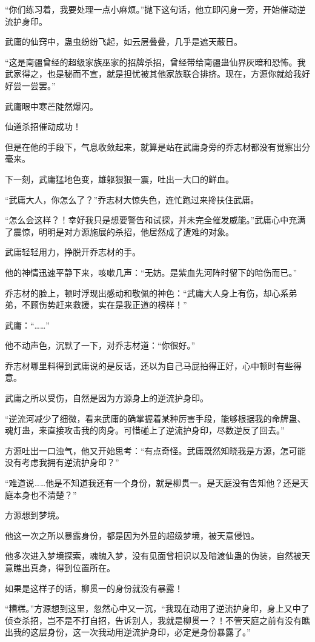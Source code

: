 \begin{this_body}
“你们练习着，我要处理一点小麻烦。”抛下这句话，他立即闪身一旁，开始催动逆流护身印。

武庸的仙窍中，蛊虫纷纷飞起，如云层叠叠，几乎是遮天蔽日。

“这是南疆曾经的超级家族巫家的招牌杀招，曾经带给南疆蛊仙界灰暗和恐怖。我武家得之，也是秘而不宣，就是担忧被其他家族联合排挤。现在，方源你就给我好好尝一尝罢。”

武庸眼中寒芒陡然爆闪。

仙道杀招催动成功！

但是在他的手段下，气息收敛起来，就算是站在武庸身旁的乔志材都没有觉察出分毫来。

下一刻，武庸猛地色变，雄躯狠狠一震，吐出一大口的鲜血。

“武庸大人，你怎么了？”乔志材大惊失色，连忙跑过来搀扶住武庸。

“怎么会这样？！幸好我只是想要警告和试探，并未完全催发威能。”武庸心中充满了震惊，明明是对方源施展的杀招，他居然成了遭难的对象。

武庸轻轻用力，挣脱开乔志材的手。

他的神情迅速平静下来，咳嗽几声：“无妨。是紫血先河阵时留下的暗伤而已。”

乔志材的脸上，顿时浮现出感动和敬佩的神色：“武庸大人身上有伤，却心系弟弟，不顾伤势赶来救援，实在是我正道的榜样！”

武庸：“……”

他不动声色，沉默了一下，对乔志材道：“你很好。”

乔志材哪里料得到武庸说的是反话，还以为自己马屁拍得正好，心中顿时有些得意。

武庸之所以受伤，自然是因为方源身上的逆流护身印。

“逆流河减少了细微，看来武庸的确掌握着某种厉害手段，能够根据我的命牌蛊、魂灯蛊，来直接攻击我的肉身。可惜碰上了逆流护身印，尽数逆反了回去。”

方源吐出一口浊气，他又开始思考：“有点奇怪。武庸既然知晓我是方源，怎可能没有考虑我拥有逆流护身印？”

“难道说……他是不知道我还有一个身份，就是柳贯一。是天庭没有告知他？还是天庭本身也不清楚？”

方源想到梦境。

他这一次之所以暴露身份，都是因为外显的超级梦境，被天意侵蚀。

他多次进入梦境探索，魂魄入梦，没有见面曾相识以及暗渡仙蛊的伪装，自然被天意瞧出真身，得到位置所在。

如果是这样子的话，柳贯一的身份就没有暴露！

“糟糕。”方源想到这里，忽然心中又一沉，“我现在动用了逆流护身印，身上又中了侦查杀招，岂不是不打自招，告诉别人，我就是柳贯一？！不管天庭之前有没有瞧出我的这层身份，这一次我动用逆流护身印，必定是身份暴露了。”


\end{this_body}
